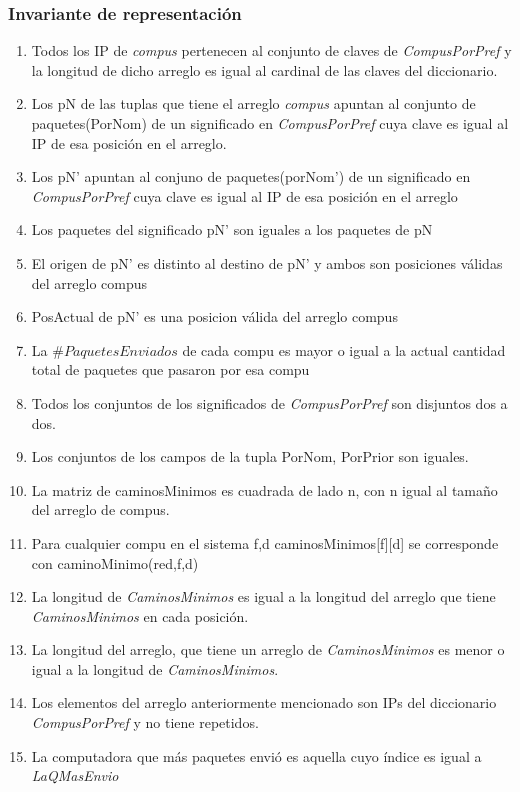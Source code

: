 \subsubsection*{Invariante de representación}

\begin{enumerate}
  \item Todos los IP de \textit{compus} pertenecen al conjunto de claves de \textit{CompusPorPref} y la longitud de dicho arreglo 
		es igual al cardinal de las claves del diccionario. 
  \item Los pN de las tuplas que tiene el arreglo \textit{compus} apuntan al conjunto de paquetes(PorNom) 
		de un significado en \textit{CompusPorPref} cuya clave es igual al IP de esa posición en el arreglo.
  \item Los pN' apuntan al conjuno de paquetes(porNom') de un significado en \textit{CompusPorPref} cuya clave es igual al IP 
		de esa posición en el arreglo
  \item Los paquetes del significado pN' son iguales a los paquetes de pN
  \item El origen de pN' es distinto al destino de pN' y ambos son posiciones válidas del arreglo compus
  \item PosActual de pN' es una posicion válida del arreglo compus
  \item La $\#PaquetesEnviados$ de cada compu es mayor o igual a la actual cantidad total de paquetes que pasaron por esa compu
  \item Todos los conjuntos de los significados de \textit{CompusPorPref} son disjuntos dos a dos.
  \item Los conjuntos de los campos de la tupla PorNom, PorPrior son iguales.
  \item La matriz de caminosMinimos es cuadrada de lado n, con n igual al tamaño del arreglo de compus.
  \item Para cualquier compu en el sistema f,d caminosMinimos[f][d] se corresponde con caminoMinimo(red,f,d)
  \item La longitud de \textit{CaminosMinimos} es igual a la longitud del arreglo que tiene \textit{CaminosMinimos} en cada posición.
  \item La longitud del arreglo, que tiene un arreglo de \textit{CaminosMinimos} es menor o igual a la longitud de \textit{CaminosMinimos}.
  \item Los elementos del arreglo anteriormente mencionado son IPs del diccionario \textit{CompusPorPref} y no tiene repetidos.
  \item La computadora que más paquetes envió es aquella cuyo índice es igual a \textit{LaQMasEnvio}
\end{enumerate}

